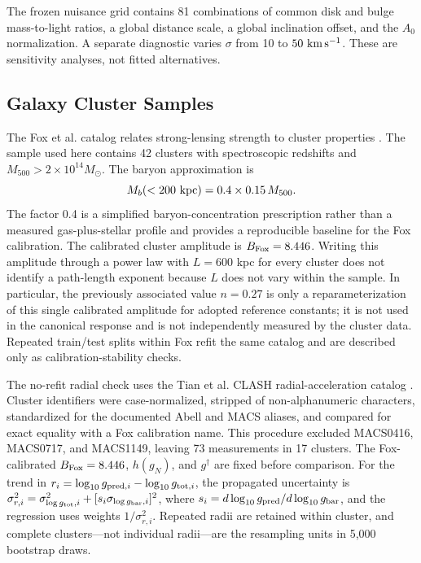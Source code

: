 \documentclass[aps,prd,reprint,superscriptaddress,showpacs,floatfix,longbibliography]{revtex4-2}
\begin{document}
The frozen nuisance grid contains 81 combinations of common disk and bulge mass-to-light ratios, a global distance scale, a global inclination offset, and the $A_0$ normalization. A separate diagnostic varies $\sigma$ from 10 to $50\ {\rm km\,s^{-1}}$. These are sensitivity analyses, not fitted alternatives.

\subsection{Galaxy Cluster Samples}

The Fox et al. catalog relates strong-lensing strength to cluster properties \cite{ref8}. The sample used here contains 42 clusters with spectroscopic redshifts and $M_{500}>2\times10^{14}M_\odot$. The baryon approximation is
\begin{equation}
M_b(<200\ {\rm kpc})=0.4\times0.15\,M_{500}.
\label{eq:clusterbaryon}
\end{equation}
The factor 0.4 is a simplified baryon-concentration prescription rather than a measured gas-plus-stellar profile and provides a reproducible baseline for the Fox calibration. The calibrated cluster amplitude is $B_{\rm Fox}=8.446$. Writing this amplitude through a power law with $L=600$ kpc for every cluster does not identify a path-length exponent because $L$ does not vary within the sample. In particular, the previously associated value $n=0.27$ is only a reparameterization of this single calibrated amplitude for adopted reference constants; it is not used in the canonical response and is not independently measured by the cluster data. Repeated train/test splits within Fox refit the same catalog and are described only as calibration-stability checks.

The no-refit radial check uses the Tian et al. CLASH radial-acceleration catalog \cite{ref9}. Cluster identifiers were case-normalized, stripped of non-alphanumeric characters, standardized for the documented Abell and MACS aliases, and compared for exact equality with a Fox calibration name. This procedure excluded MACS0416, MACS0717, and MACS1149, leaving 73 measurements in 17 clusters. The Fox-calibrated $B_{\rm Fox}=8.446$, $h(g_N)$, and $g^\dagger$ are fixed before comparison. For the trend in $r_i=\log_{10}g_{{\rm pred},i}-\log_{10}g_{{\rm tot},i}$, the propagated uncertainty is $\sigma_{r,i}^2=\sigma_{\log g_{\rm tot},i}^2+[s_i\sigma_{\log g_{\rm bar},i}]^2$, where $s_i=d\log_{10}g_{\rm pred}/d\log_{10}g_{\rm bar}$, and the regression uses weights $1/\sigma_{r,i}^2$. Repeated radii are retained within cluster, and complete clusters---not individual radii---are the resampling units in 5,000 bootstrap draws.
\end{document}
